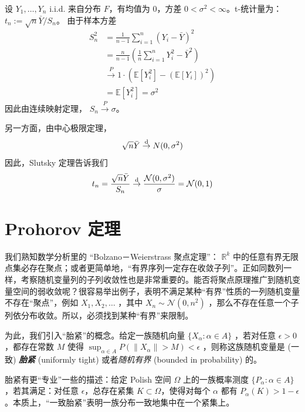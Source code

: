 \begin{example}[$t$-统计量的渐近分布]
设 $Y_{1}, \ldots , Y_{n}$ i.i.d. 来自分布 $F$，有均值为 0，方差 $0<\sigma^2<\infty$。t-统计量为：$t_{n} := \sqrt{n} \bar{Y} / S_{n}$。 由于样本方差
\[\begin{aligned} S_n^2 &= \frac{1}{n - 1}\sum_{i = 1}^n(Y_i - \bar{Y})^2 \\ &= \frac{n}{n - 1}\left(\frac{1}n\sum_{i = 1}^nY_i^2 - \bar{Y}^2\right) \\ &\overset P\to  1 \cdot (\mathbb E [Y_i^2] - (\mathbb E [Y_i])^2)\\  &= \mathbb E [Y_i^2] =\sigma^2\end{aligned}\]
因此由连续映射定理， $S_{n}\overset P\to \sigma$。

另一方面，由中心极限定理，
\[\sqrt{n} \bar{Y}\overset{\rm d}\to N(0, \sigma^2)\]
因此，Slutsky 定理告诉我们
\[t_n=\frac{\sqrt{n} \bar{Y}}{S_{n}} \overset{\rm d}\to \frac{\mathcal{N}(0,\sigma^2)}{\sigma}= \mathcal{N}(0, 1)\]

\end{example}

\section{Prohorov 定理}

我们熟知数学分析里的 ``Bolzano－Weierstrass 聚点定理''： $\mathbb R^k$ 中的任意有界无限点集必存在聚点；或者更简单地，``有界序列一定存在收敛子列''。正如同数列一样，考察随机变量列的子列收敛性也是非常重要的。能否将聚点原理推广到随机变量空间的弱收敛呢？很容易举出例子，表明不满足某种``有界''性质的一列随机变量不存在``聚点''，例如 $X_1,X_2,\dots$ ，其中 $X_n \sim \mathcal N(0,n^2)$ ，那么不存在任意一个子列依分布收敛。所以，必须找到某种``有界''来限制。
\begin{definition}
  为此，我们引入``胎紧''的概念。给定一族随机向量 $\{X_\alpha:\alpha\in A\}$ ，若对任意 $\epsilon>0$ ，都存在常数 $M$ 使得 $\sup_{\alpha\in A}P(\|X_\alpha\|>M)<\epsilon$ ，则称这族随机变量是 (一致) \textbf{\emph{胎紧}} (uniformly tight) 或者\emph{随机有界} (bounded in probability) 的。
\end{definition}

\begin{remark}
胎紧有更``专业''一些的描述：给定 Polish 空间 $\Omega$ 上的一族概率测度 $\{P_\alpha:\alpha\in A\}$，若其满足：对任意 $\epsilon$，总存在紧集 $K\subset \Omega$，使得对每个 $\alpha$ 都有 $P_\alpha(K)>1-\epsilon$。本质上，``一致胎紧''表明一族分布一致地集中在一个紧集上。
\end{remark}

